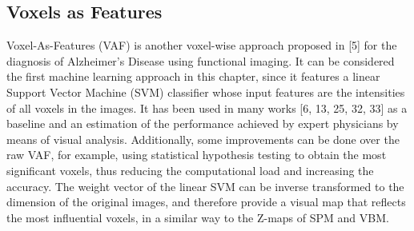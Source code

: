 \subsection{Voxels as Features}
Voxel-As-Features (VAF) is another voxel-wise approach proposed in [5] for the diagnosis of Alzheimer’s Disease using functional imaging. It can be considered the first machine learning approach in this chapter, since it features a linear Support Vector Machine (SVM) classifier whose input features are the intensities of all voxels in the images. It has been used in many works [6, 13, 25, 32, 33] as a baseline and an estimation of the performance achieved by expert physicians by means of visual analysis. 
Additionally, some improvements can be done over the raw VAF, for example, using statistical hypothesis testing to obtain the most significant voxels, thus reducing the computational load and increasing the accuracy. The weight vector of the linear SVM can be inverse transformed to the dimension of the original images, and therefore provide a visual map that reflects the most influential voxels, in a similar way to the Z-maps of SPM and VBM. 